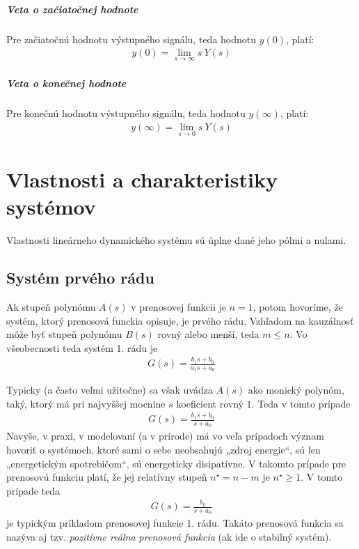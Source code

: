 \documentclass[a4paper, 10pt, ]{article}
\begin{document}
\subparagraph{Veta o začiatočnej hodnote}
Pre začiatočnú hodnotu výstupného signálu, teda hodnotu $y(0)$, platí:
\begin{align}
	y(0) = \lim_{s\to\infty} s\ Y(s)
\end{align}

\subparagraph{Veta o konečnej hodnote}
Pre konečnú hodnotu výstupného signálu, teda hodnotu $y(\infty)$, platí:
\begin{align}
	y(\infty) = \lim_{s\to0} s\ Y(s)
\end{align}











\section{Vlastnosti a charakteristiky systémov}

Vlastnosti lineárneho dynamického systému sú úplne dané jeho pólmi a nulami.


\subsection{Systém prvého rádu}

Ak stupeň polynómu $A(s)$ v prenosovej funkcii je $n = 1$, potom hovoríme, že systém, ktorý prenosová funckia opisuje, je prvého rádu. Vzhľadom na kauzálnosť môže byť stupeň polynómu $B(s)$ rovný alebo menší, teda $m \leq n$. Vo všeobecnosti teda systém 1. rádu je
\begin{align}
    G(s) = \frac{b_1 s + b_0}{a_1 s + a_0}
\end{align}

Typicky (a často veľmi užitočne) sa však uvádza $A(s)$ ako monický polynóm, taký, ktorý má pri najvyššej mocnine $s$ koeficient rovný $1$. Teda v tomto prípade
\begin{align}
    G(s) = \frac{b_1 s + b_0}{s + a_0}
\end{align}
Navyše, v praxi, v modelovaní (a v prírode) má vo veľa prípadoch význam hovoriť o systémoch, ktoré sami o sebe neobsahujú „zdroj energie“, sú len „energetickým spotrebičom“, sú energeticky disipatívne. V takomto prípade pre prenosovú funkciu platí, že jej relatívny stupeň $n^\star = n-m$ je $n^\star \geq 1$. V tomto prípade teda
\begin{align} \label{typ1radtf}
    G(s) = \frac{b_0}{s + a_0}
\end{align}
je typickým príkladom prenosovej funkcie 1. rádu. Takáto prenosová funkcia sa nazýva aj tzv. \emph{pozitívne reálna prenosová funkcia} (ak ide o stabilný systém).
\end{document}
